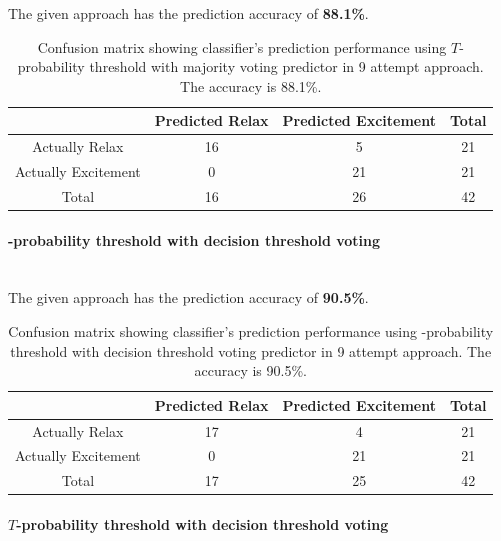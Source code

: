 \documentclass[12pt]{article}
\theoremstyle{definition}
\begin{document}
The given approach has the prediction accuracy of \textbf{88.1\%}.  
\begin{table}[H]
\begin{center}
  \begin{tabular}{ | c | c | c | c | }
    \hline
     & Predicted Relax & Predicted Excitement & Total \\ \hline
    Actually Relax & 16 & 5 & 21 \\ \hline
    Actually Excitement & 0 & 21 & 21 \\ \hline
    Total & 16 & 26 & 42 \\ 
    \hline
  \end{tabular}
\end{center}
\caption{Confusion matrix showing classifier's prediction performance using $T$-probability threshold with majority voting predictor in 9 attempt approach. The accuracy is 88.1\%.} 
\end{table}

\paragraph{-probability threshold with decision threshold voting}~\\

The given approach has the prediction accuracy of \textbf{90.5\%}.  
\begin{table}[H]
\begin{center}
  \begin{tabular}{ | c | c | c | c | }
    \hline
     & Predicted Relax & Predicted Excitement & Total \\ \hline
    Actually Relax & 17 & 4 & 21 \\ \hline
    Actually Excitement & 0 & 21 & 21 \\ \hline
    Total & 17 & 25 & 42 \\ 
    \hline
  \end{tabular}
\end{center}
\caption{Confusion matrix showing classifier's prediction performance using -probability threshold with decision threshold voting predictor in 9 attempt approach. The accuracy is 90.5\%.} 
\end{table}

\paragraph{$T$-probability threshold with decision threshold voting}~\\
\end{document}
